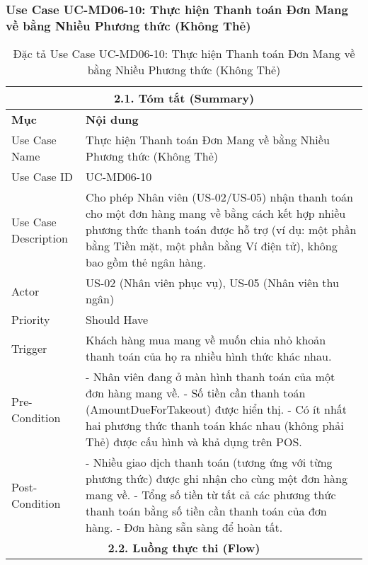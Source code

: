 \subsubsection{Use Case UC-MD06-10: Thực hiện Thanh toán Đơn Mang về bằng Nhiều Phương thức (Không Thẻ)}
\begin{longtable}{|m{4cm}|p{11cm}|}
\caption{Đặc tả Use Case UC-MD06-10: Thực hiện Thanh toán Đơn Mang về bằng Nhiều Phương thức (Không Thẻ)} \label{tab:uc_md06_10_final_v3} \\
\hline
\multicolumn{2}{|c|}{\textbf{2.1. Tóm tắt (Summary)}} \\
\hline
\textbf{Mục} & \textbf{Nội dung} \\
\hline
\endhead %
\hline
\endfoot %
\hline
\endlastfoot %
Use Case Name & Thực hiện Thanh toán Đơn Mang về bằng Nhiều Phương thức (Không Thẻ) \\
\hline
Use Case ID & UC-MD06-10 \\
\hline
Use Case Description & Cho phép Nhân viên (US-02/US-05) nhận thanh toán cho một đơn hàng mang về bằng cách kết hợp nhiều phương thức thanh toán được hỗ trợ (ví dụ: một phần bằng Tiền mặt, một phần bằng Ví điện tử), không bao gồm thẻ ngân hàng. \\
\hline
Actor & US-02 (Nhân viên phục vụ), US-05 (Nhân viên thu ngân) \\
\hline
Priority & Should Have \\
\hline
Trigger & Khách hàng mua mang về muốn chia nhỏ khoản thanh toán của họ ra nhiều hình thức khác nhau. \\
\hline
Pre-Condition & - Nhân viên đang ở màn hình thanh toán của một đơn hàng mang về. \newline - Số tiền cần thanh toán (AmountDueForTakeout) được hiển thị. \newline - Có ít nhất hai phương thức thanh toán khác nhau (không phải Thẻ) được cấu hình và khả dụng trên POS. \\
\hline
Post-Condition & - Nhiều giao dịch thanh toán (tương ứng với từng phương thức) được ghi nhận cho cùng một đơn hàng mang về. \newline - Tổng số tiền từ tất cả các phương thức thanh toán bằng số tiền cần thanh toán của đơn hàng. \newline - Đơn hàng sẵn sàng để hoàn tất. \\
\hline
\multicolumn{2}{|c|}{\textbf{2.2. Luồng thực thi (Flow)}} \\

\end{longtable}
